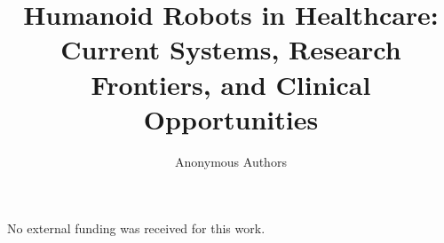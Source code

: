 \documentclass[acmsmall]{acmart}
\title{Humanoid Robots in Healthcare: Current Systems, Research Frontiers,
       and Clinical Opportunities}
\author{Anonymous Authors}
\begin{document}
\maketitle















\begin{acks}
No external funding was received for this work.
\end{acks}





\end{document}
